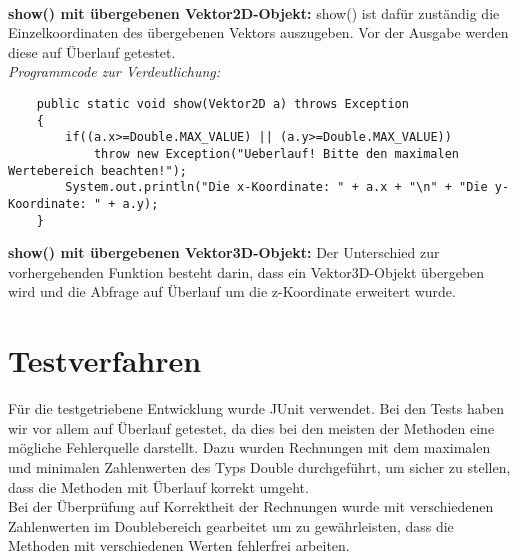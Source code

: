 \documentclass[a4paper,11pt]{scrartcl}
\begin{document}
\\
\textbf{show() mit übergebenen Vektor2D-Objekt:} show() ist dafür zuständig die Einzelkoordinaten des übergebenen Vektors auszugeben. Vor der Ausgabe werden diese auf Überlauf getestet.\\
\textit{Programmcode zur Verdeutlichung:}
\begin{lstlisting}
	public static void show(Vektor2D a) throws Exception
	{
		if((a.x>=Double.MAX_VALUE) || (a.y>=Double.MAX_VALUE))
			throw new Exception("Ueberlauf! Bitte den maximalen Wertebereich beachten!");
		System.out.println("Die x-Koordinate: " + a.x + "\n" + "Die y-Koordinate: " + a.y);
	}
\end{lstlisting} $\;$ \\
\textbf{show() mit übergebenen Vektor3D-Objekt:} Der Unterschied zur vorhergehenden Funktion besteht darin, dass ein Vektor3D-Objekt übergeben wird und die Abfrage auf Überlauf um die z-Koordinate erweitert wurde.\\
\section{Testverfahren}
Für die testgetriebene Entwicklung wurde JUnit verwendet. Bei den Tests haben wir vor allem auf Überlauf getestet, da dies bei den meisten der Methoden eine mögliche Fehlerquelle darstellt. Dazu wurden Rechnungen mit dem maximalen und minimalen Zahlenwerten des Typs Double durchgeführt, um sicher zu stellen, dass die Methoden mit Überlauf korrekt umgeht. 
\\
Bei der Überprüfung auf Korrektheit der Rechnungen wurde mit verschiedenen Zahlenwerten im Doublebereich gearbeitet um zu gewährleisten, dass die Methoden mit verschiedenen Werten fehlerfrei arbeiten. 
\end{document}
